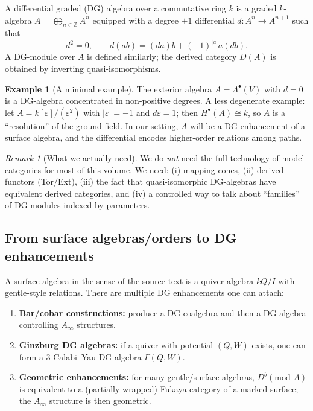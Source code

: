 \documentclass[11pt,oneside]{amsbook}
\numberwithin{equation}{section}
\theoremstyle{plain}
\theoremstyle{definition}
\newtheorem{example}[theorem]{Example}
\theoremstyle{remark}
\newtheorem{remark}[theorem]{Remark}
\newcommand{\Z}{\mathbb{Z}}
\begin{document}
A differential graded (DG) algebra over a commutative ring $k$ is a graded $k$-algebra
$A=\bigoplus_{n\in\Z} A^n$ equipped with a degree $+1$ differential $d:A^n\to A^{n+1}$ such that
\[
d^2=0,\qquad d(ab)=(da)b+(-1)^{|a|}a(db).
\]
A DG-module over $A$ is defined similarly; the derived category $D(A)$ is obtained by inverting quasi-isomorphisms.

\begin{example}[A minimal example]
The exterior algebra $A=\Lambda^\bullet(V)$ with $d=0$ is a DG-algebra concentrated in non-positive degrees.  A less degenerate example: let $A=k[\varepsilon]/(\varepsilon^2)$ with $|\varepsilon|=-1$ and $d\varepsilon=1$; then $H^\bullet(A)\cong k$, so $A$ is a ``resolution'' of the ground field.  In our setting, $A$ will be a DG enhancement of a surface algebra, and the differential encodes higher-order relations among paths.
\end{example}

\begin{remark}[What we actually need]
We do \emph{not} need the full technology of model categories for most of this volume.
We need: (i) mapping cones, (ii) derived functors (Tor/Ext), (iii) the fact that quasi-isomorphic DG-algebras have equivalent derived categories, and (iv) a controlled way to talk about ``families'' of DG-modules indexed by parameters.
\end{remark}

\subsection{From surface algebras/orders to DG enhancements}
\label{sec:dg_from_surface}

A surface algebra in the sense of the source text is a quiver algebra $kQ/I$ with gentle-style relations.
There are multiple DG enhancements one can attach:

\begin{enumerate}
\item \textbf{Bar/cobar constructions:} produce a DG coalgebra and then a DG algebra controlling $A_\infty$ structures.
\item \textbf{Ginzburg DG algebras:} if a quiver with potential $(Q,W)$ exists, one can form a 3-Calabi--Yau DG algebra $\Gamma(Q,W)$.
\item \textbf{Geometric enhancements:} for many gentle/surface algebras, $D^b(\mathrm{mod}\text{-}A)$ is equivalent to a (partially wrapped) Fukaya category of a marked surface; the $A_\infty$ structure is then geometric.
\end{enumerate}
\end{document}
